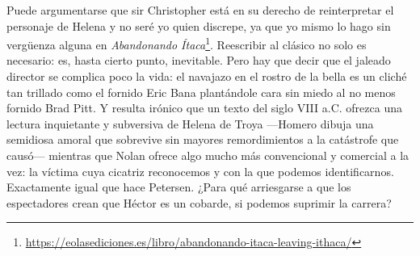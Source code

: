 

Puede argumentarse que sir Christopher está en su derecho de reinterpretar el personaje de Helena y no seré yo quien discrepe, ya que yo mismo lo hago sin vergüenza alguna en \emph{Abandonando Ítaca}\footnote{\url{https://eolasediciones.es/libro/abandonando-itaca-leaving-ithaca/}}.
Reescribir al clásico no solo es necesario: es, hasta cierto punto, inevitable. Pero hay que decir que el jaleado director se complica poco la vida: el navajazo en el rostro de la bella es un cliché tan trillado como el fornido Eric Bana plantándole cara sin miedo al no menos fornido Brad Pitt. Y resulta irónico que un texto del siglo VIII a.C. ofrezca una lectura inquietante y subversiva de Helena de Troya ---Homero dibuja una semidiosa amoral que sobrevive sin mayores remordimientos a la catástrofe que causó--- mientras que Nolan ofrece algo mucho más convencional y comercial a la vez: la víctima cuya cicatriz reconocemos y con la que podemos identificarnos. Exactamente igual que hace Petersen. ¿Para qué arriesgarse a que los espectadores crean que Héctor es un cobarde, si podemos suprimir la carrera?

